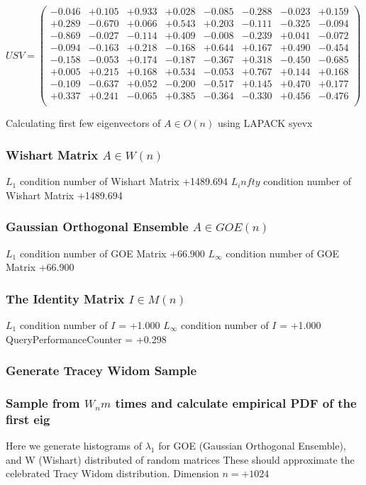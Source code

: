\documentclass[9pt]{article}
\theoremstyle{plain}
\theoremstyle{definition}
\theoremstyle{remark}
\numberwithin{equation}{section}
\begin{document}
$U S V = \left(
\begin{array}{
cccccccc}
-0.046 & +0.105 & +0.933 & +0.028 & -0.085 & -0.288 & -0.023 & +0.159 \\
+0.289 & -0.670 & +0.066 & +0.543 & +0.203 & -0.111 & -0.325 & -0.094 \\
-0.869 & -0.027 & -0.114 & +0.409 & -0.008 & -0.239 & +0.041 & -0.072 \\
-0.094 & -0.163 & +0.218 & -0.168 & +0.644 & +0.167 & +0.490 & -0.454 \\
-0.158 & -0.053 & +0.174 & -0.187 & -0.367 & +0.318 & -0.450 & -0.685 \\
+0.005 & +0.215 & +0.168 & +0.534 & -0.053 & +0.767 & +0.144 & +0.168 \\
-0.109 & -0.637 & +0.052 & -0.200 & -0.517 & +0.145 & +0.470 & +0.177 \\
+0.337 & +0.241 & -0.065 & +0.385 & -0.364 & -0.330 & +0.456 & -0.476 \\
\end{array}
\right)$ \newline 

Calculating first few eigenvectors of $A \in O(n)$ using LAPACK syevx

\subsubsection{Wishart Matrix $A \in W(n)$}
$L_1$ condition number of Wishart Matrix +1489.694
$L_infty$ condition number of Wishart Matrix +1489.694
\subsubsection{Gaussian Orthogonal Ensemble $A \in GOE(n)$}
$L_1$ condition number of GOE Matrix +66.900
$L_\infty$ condition number of GOE Matrix +66.900
\subsubsection{The Identity Matrix $I \in M(n)$}
$L_1$ condition number of $I$ = +1.000
$L_\infty$ condition number of $I$ = +1.000
QueryPerformanceCounter  =  +0.298
\subsubsection{Generate Tracey Widom Sample}
\subsubsection{Sample from $W_n m$ times and calculate empirical PDF of the first eig}
Here we generate histograms of $\lambda_1$ for GOE (Gaussian Orthogonal Ensemble), and W (Wishart) 		 distributed of random matrices
These should approximate the celebrated Tracy Widom distribution.
Dimension $n = +1024$
\end{document}
